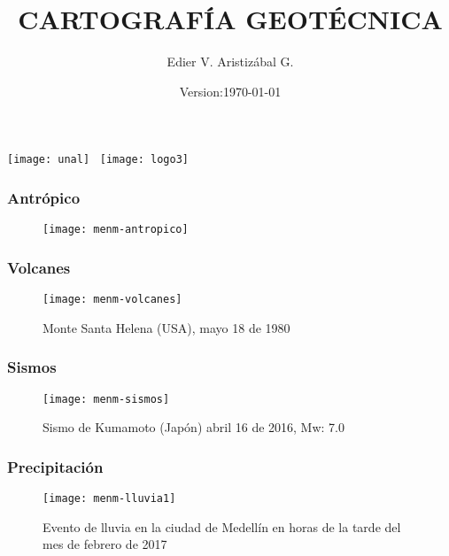 \documentclass[12pt]{beamer}
\title[Factor detonante]{CARTOGRAFÍA GEOTÉCNICA}
\author[Edier Aristizábal]{Edier V. Aristizábal G.}
\institute{\emph{evaristizabalg@unal.edu.co}}
\date{Version:\today}
\begin{document}
\begin{frame}
\titlepage
\centering
\texttt{[image: unal]}\hspace*{4.75cm}~%
\texttt{[image: logo3]} 
\end{frame}
\begin{frame}
\frametitle{Antrópico}
\begin{figure}
\centering
\texttt{[image: menm-antropico]} 
\end{figure}
\end{frame}
\begin{frame}
\frametitle{Volcanes}
\begin{figure}
\centering
\texttt{[image: menm-volcanes]} 
\caption{Monte Santa Helena (USA), mayo 18 de 1980}
\end{figure}
\end{frame}
\begin{frame}
\frametitle{Sismos}
\begin{figure}
\centering
\texttt{[image: menm-sismos]} 
\caption{Sismo de Kumamoto (Japón) abril 16 de 2016, Mw: 7.0}
\end{figure}
\end{frame}
\begin{frame}
\frametitle{Precipitación}
\begin{figure}
\centering
\texttt{[image: menm-lluvia1]} 
\caption{Evento de lluvia en la ciudad de Medellín en horas de la tarde del mes de febrero de 2017}
\end{figure}
\end{frame}
\end{document}
